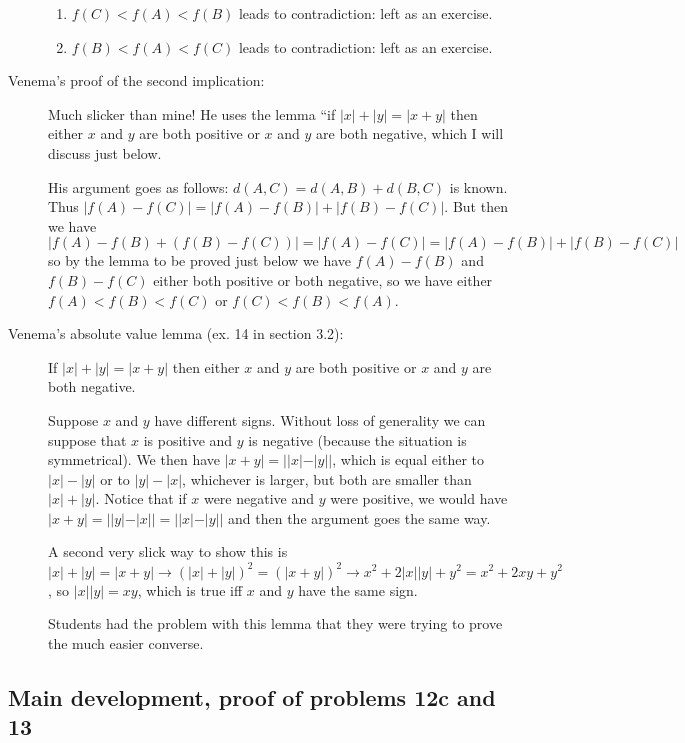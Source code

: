 \documentclass[12pt]{article}
\begin{document}
\begin{description}
\begin{enumerate}
\item $f(C)<f(A)<f(B)$ leads to contradiction:  left as an exercise.

\item $f(B)<f(A)<f(C)$ leads to contradiction:  left as an exercise.

\end{enumerate}

\item[Venema's proof of the second implication:]  Much slicker than mine!  He uses the lemma ``if $|x|+|y| = |x+y|$ then either $x$ and $y$ are both positive or $x$ and $y$ are both negative, which I will discuss just below.

His argument goes as follows:  $d(A,C) = d(A,B)+d(B,C)$ is known.  Thus $|f(A)-f(C)| =|f(A)-f(B)| + |f(B)-f(C)|$.  But then we have $|f(A)-f(B)+(f(B)-f(C))| = |f(A)-f(C)| =|f(A)-f(B)| + |f(B)-f(C)|$ so by the lemma to be proved just below we have $f(A)-f(B)$ and $f(B)-f(C)$ either both positive or both negative, so we have either $f(A)<f(B)<f(C)$ or $f(C)<f(B)<f(A)$.

\item[Venema's absolute value lemma (ex. 14 in section 3.2):]  If $|x| + |y| = |x+y|$ then either $x$ and $y$ are both positive or $x$ and $y$ are both negative.

Suppose $x$ and $y$ have different signs.  Without loss of generality we can suppose that $x$ is positive and $y$ is negative (because the situation is symmetrical).  We then have $|x+y| = ||x|-|y||$, which is equal either to
$|x|-|y|$ or to $|y|-|x|$, whichever is larger, but both are smaller than $|x|+|y|$. Notice that if $x$ were negative and $y$ were positive, we would have $|x+y| = ||y|-|x|| = ||x|-|y||$ and then the argument goes the same way.

A second very slick way to show this is $|x|+|y| = |x+y| \rightarrow (|x|+|y|)^2 = (|x+y|)^2 \rightarrow x^2+2|x||y| +y^2 = x^2 + 2xy +y^2$, so $|x||y| = xy$, which is true iff $x$ and $y$ have the same sign.

Students had the problem with this lemma that they were trying to prove the much easier converse.

\end{description}

\subsection{Main development, proof of problems 12c and 13}
\end{document}
